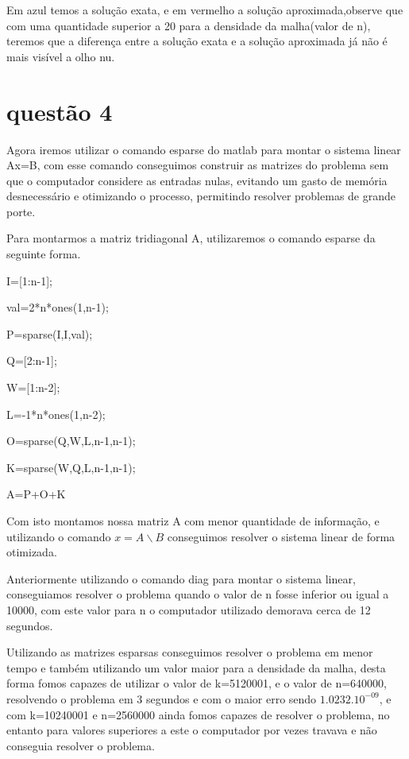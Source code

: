 \documentclass[a4paper]{article}
\begin{document}
  \clearpage
  
   Em azul temos a solução exata, e em vermelho a solução aproximada,observe que com uma quantidade superior a 20 para a densidade da malha(valor de n), teremos que a diferença entre a solução exata e a solução aproximada já não é mais visível a olho nu.
  
  
  
  
  \section{questão 4}
  
  Agora iremos utilizar o comando esparse do matlab para montar o sistema linear Ax=B, com esse comando conseguimos construir as matrizes do problema sem que o computador considere as entradas nulas, evitando um gasto de memória desnecessário e otimizando o processo, permitindo resolver problemas de grande porte.
  
  Para montarmos a matriz tridiagonal A, utilizaremos o comando esparse da seguinte forma.

I=[1:n-1];

val=2*n*ones(1,n-1);

P=sparse(I,I,val);

Q=[2:n-1];

W=[1:n-2];

L=-1*n*ones(1,n-2);

O=sparse(Q,W,L,n-1,n-1);

K=sparse(W,Q,L,n-1,n-1);

A=P+O+K

Com isto montamos nossa matriz A com menor quantidade de informação, e utilizando o comando $x=A \backslash B$ conseguimos resolver o sistema linear de forma otimizada.

Anteriormente utilizando o comando diag para montar o sistema linear, conseguiamos resolver o problema quando o valor de n fosse inferior ou igual a 10000, com este valor para n o computador utilizado demorava cerca de 12 segundos.

Utilizando as matrizes esparsas conseguimos resolver o problema em menor tempo e também utilizando um valor maior para a densidade da malha, desta forma fomos capazes de utilizar o valor de k=5120001, e o valor de n=640000, resolvendo o problema em 3 segundos e com o maior erro sendo  \(1.0232.10^{-09}\), e com k=10240001 e n=2560000 ainda fomos capazes de resolver o problema, no entanto para valores superiores a este o computador por vezes travava e não conseguia resolver o problema.
\end{document}

